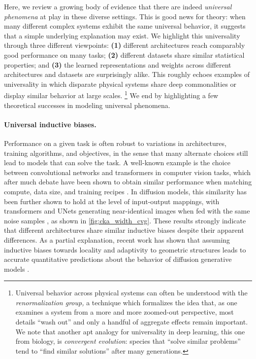 Here, we review a growing body of evidence that there are indeed \textit{universal phenomena} at play in these diverse settings.
This is good news for theory: when many different complex systems exhibit the same universal behavior, it suggests that a simple underlying explanation may exist.
We highlight this universality through three different viewpoints: \textbf{(1)} different architectures
reach comparably good performance on many tasks; \textbf{(2)} different datasets share similar statistical properties; and \textbf{(3)} the learned representations and weights across different architectures and datasets are surprisingly alike.
This roughly echoes examples of universality in which disparate physical systems share deep commonalities %
or display similar behavior at large scales.%
\footnote{Universal behavior across physical systems can often be understood with the \textit{renormalization group,} a technique which formalizes the idea that, as one examines a system from a more and more zoomed-out perspective, most details ``wash out'' and only a handful of aggregate effects remain important. We note that another apt analogy for universality in deep learning, this one from biology, is \textit{convergent evolution}: species that ``solve similar problems'' tend to ``find similar solutions'' after many generations.}
We end by highlighting a few theoretical successes in modeling universal phenomena.







\paragraph{Universal inductive biases.}
Performance on a given task is often robust to variations in architectures, training algorithms, and objectives, in the sense that many alternate choices still lead to models that can solve the task.
A well-known example is the choice between convolutional networks and transformers in computer vision tasks, which after much debate have been shown to obtain similar performance when matching compute, data size, and training recipes \citep{liu2022convnet,smith2023convnets}.
In diffusion models, this similarity has been further shown to hold at the level of input-output mappings, with transformers and UNets generating near-identical images when fed with the same noise samples \citep{zhang2024emergence}, as shown in \cref{fig:cka_width_cvg}.
These results strongly indicate that different architectures share similar inductive biases despite their apparent differences.
As a partial explanation, recent work has shown that assuming inductive biases towards locality and adaptivity to geometric structures leads to accurate quantitative predictions about the behavior of diffusion generative models \citep{kadkhodaie2024generalization, kambanalytic, niedobatowards}.




